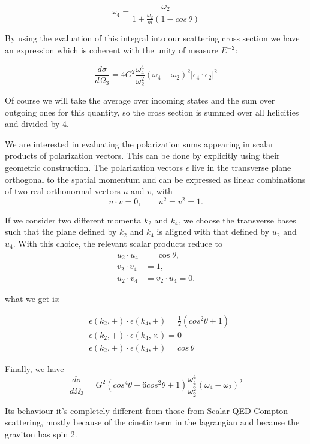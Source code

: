 \documentclass[12pt,a4paper]{article}
\begin{document}
\begin{equation}
    \omega_4 = \frac{\omega_2}{1+\frac{\omega_2}{m}(1-cos\,\theta)}
\end{equation}

By using the evaluation of this integral into our scattering cross section we have an expression which is coherent with the unity of measure $E^{-2}$:

\begin{equation}
    \frac{d\sigma}{d\Omega_3}=4G^2\frac{\omega_4^4}{\omega_2^2}(\omega_4-\omega_2)^2 |\epsilon_4 \cdot \epsilon_2|^2
\end{equation}

Of course we will take the average over incoming states and the sum over outgoing ones for this quantity, so the cross section is summed over all helicities and divided by 4.

We are interested in evaluating the polarization sums appearing in scalar products of polarization vectors. This can be done by explicitly using their geometric construction. The polarization vectors $\epsilon$ live in the transverse plane orthogonal to the spatial momentum and can be expressed as linear combinations of two real orthonormal vectors $u$ and $v$, with
\[
u \cdot v = 0, \qquad u^2 = v^2 = 1.
\]

If we consider two different momenta $k_2$ and $k_4$, we choose the transverse bases such that the plane defined by $k_2$ and $k_4$ is aligned with that defined by $u_2$ and $u_4$. With this choice, the relevant scalar products reduce to
\begin{align}
   u_2 \cdot u_4 &= \cos \theta,\\
   v_2 \cdot v_4 &= 1,\\
   u_2 \cdot v_4 &= v_2 \cdot u_4 = 0.
\end{align}

what we get is:

\begin{align}
    &\epsilon (k_2,+)\cdot \epsilon (k_4, +) = \frac12(cos^2\theta+1)\\
    &\epsilon (k_2,+)\cdot \epsilon (k_4, \times) = 0\\
    &\epsilon (k_2,+)\cdot \epsilon (k_4, +) = cos\, \theta
\end{align}

Finally, we have 
$$
\boxed{
\frac{d\sigma}{d\Omega_3}=G^2(cos^4\theta + 6 cos ^ 2\theta+1 )\frac{\omega_4^4}{\omega_2^2}(\omega_4-\omega_2)^2 
}
$$

Its behaviour it's completely different from those from Scalar QED Compton scattering, mostly because of the cinetic term in the lagrangian and because the graviton has spin 2.
\end{document}
